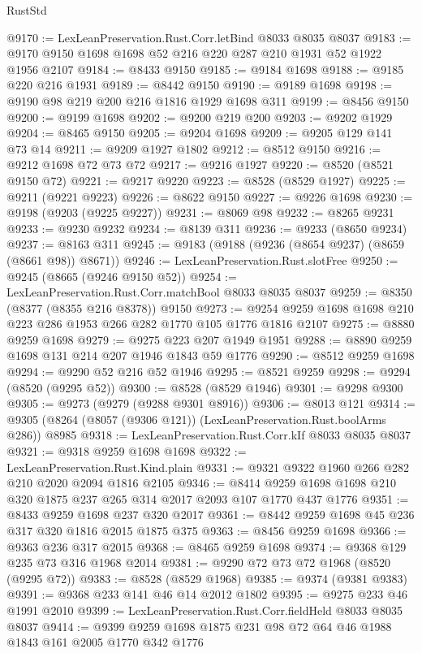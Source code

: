 \begin{lexlean}{RustStd}
\begin{coremodule}
{\begin{coremodule}
{{{{{{{{{{{{{{{{{{{{{{{{{{{{{{{{{{{{{{{{{{{{{{{@9170 := LexLeanPreservation.Rust.Corr.letBind @8033 @8035 @8037
@9183 := @9170 @9150 @1698 @1698 @52 @216 @220 @287 @210 @1931 @52 @1922 @1956 @2107
@9184 := @8433 @9150
@9185 := @9184 @1698
@9188 := @9185 @220 @216 @1931
@9189 := @8442 @9150
@9190 := @9189 @1698
@9198 := @9190 @98 @219 @200 @216 @1816 @1929 @1698 @311
@9199 := @8456 @9150
@9200 := @9199 @1698
@9202 := @9200 @219 @200
@9203 := @9202 @1929
@9204 := @8465 @9150
@9205 := @9204 @1698
@9209 := @9205 @129 @141 @73 @14
@9211 := @9209 @1927 @1802
@9212 := @8512 @9150
@9216 := @9212 @1698 @72 @73 @72
@9217 := @9216 @1927
@9220 := @8520 (@8521 @9150 @72)
@9221 := @9217 @9220
@9223 := @8528 (@8529 @1927)
@9225 := @9211 (@9221 @9223)
@9226 := @8622 @9150
@9227 := @9226 @1698
@9230 := @9198 (@9203 (@9225 @9227))
@9231 := @8069 @98
@9232 := @8265 @9231
@9233 := @9230 @9232
@9234 := @8139 @311
@9236 := @9233 (@8650 @9234)
@9237 := @8163 @311
@9245 := @9183 (@9188 (@9236 (@8654 @9237) (@8659 (@8661 @98)) @8671))
@9246 := LexLeanPreservation.Rust.slotFree
@9250 := @9245 (@8665 (@9246 @9150 @52))
@9254 := LexLeanPreservation.Rust.Corr.matchBool @8033 @8035 @8037
@9259 := @8350 (@8377 (@8355 @216 @8378)) @9150
@9273 := @9254 @9259 @1698 @1698 @210 @223 @286 @1953 @266 @282 @1770 @105 @1776 @1816 @2107
@9275 := @8880 @9259 @1698
@9279 := @9275 @223 @207 @1949 @1951
@9288 := @8890 @9259 @1698 @131 @214 @207 @1946 @1843 @59 @1776
@9290 := @8512 @9259 @1698
@9294 := @9290 @52 @216 @52 @1946
@9295 := @8521 @9259
@9298 := @9294 (@8520 (@9295 @52))
@9300 := @8528 (@8529 @1946)
@9301 := @9298 @9300
@9305 := @9273 (@9279 (@9288 @9301 @8916))
@9306 := @8013 @121
@9314 := @9305 (@8264 (@8057 (@9306 @121)) (LexLeanPreservation.Rust.boolArms @286)) @8985
@9318 := LexLeanPreservation.Rust.Corr.kIf @8033 @8035 @8037
@9321 := @9318 @9259 @1698 @1698
@9322 := LexLeanPreservation.Rust.Kind.plain
@9331 := @9321 @9322 @1960 @266 @282 @210 @2020 @2094 @1816 @2105
@9346 := @8414 @9259 @1698 @1698 @210 @320 @1875 @237 @265 @314 @2017 @2093 @107 @1770 @437 @1776
@9351 := @8433 @9259 @1698 @237 @320 @2017
@9361 := @8442 @9259 @1698 @45 @236 @317 @320 @1816 @2015 @1875 @375
@9363 := @8456 @9259 @1698
@9366 := @9363 @236 @317 @2015
@9368 := @8465 @9259 @1698
@9374 := @9368 @129 @235 @73 @316 @1968 @2014
@9381 := @9290 @72 @73 @72 @1968 (@8520 (@9295 @72))
@9383 := @8528 (@8529 @1968)
@9385 := @9374 (@9381 @9383)
@9391 := @9368 @233 @141 @46 @14 @2012 @1802
@9395 := @9275 @233 @46 @1991 @2010
@9399 := LexLeanPreservation.Rust.Corr.fieldHeld @8033 @8035 @8037
@9414 := @9399 @9259 @1698 @1875 @231 @98 @72 @64 @46 @1988 @1843 @161 @2005 @1770 @342 @1776
}}}}}}}}}}}}}}}}}}}}}}}}}}}}}}}}}}}}}}}}}}}}}}}
\end{coremodule}}
\end{coremodule}
\end{lexlean}
